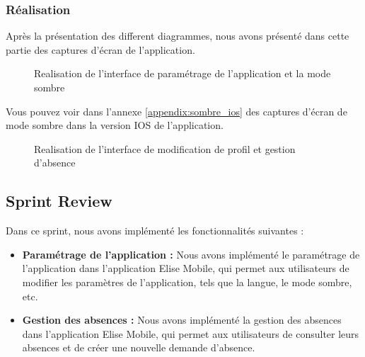 \subsubsection{Réalisation}

Après la présentation des different diagrammes, nous avons présenté dans cette partie des captures d'écran de l'application.
\begin{figure}[H]
  \centering
  \caption{Realisation de l'interface de paramétrage de l'application et la mode sombre}
  \label{fig:RealisationInterfaceParametrage}
\end{figure}

Vous pouvez voir dans l'annexe \ref{appendix:sombre_ios} des captures d'écran de mode sombre dans la version IOS de l'application.

\begin{figure}[H]
  \centering
  \caption{Realisation de l'interface de modification de profil et gestion d'absence}
  \label{fig:RealisationInterfaceModificationProfil}
\end{figure}

\subsection{Sprint Review}
Dans ce sprint, nous avons implémenté les fonctionnalités suivantes :
\begin{itemize}
  \item \textbf{Paramétrage de l'application :} Nous avons implémenté le paramétrage de l'application dans l'application Elise Mobile, qui permet aux utilisateurs de modifier les paramètres de l'application, tels que la langue, le mode sombre, etc.\\
  \item \textbf{Gestion des absences :} Nous avons implémenté la gestion des absences dans l'application Elise Mobile, qui permet aux utilisateurs de consulter leurs absences et de créer une nouvelle demande d'absence.\\
\end{itemize}
